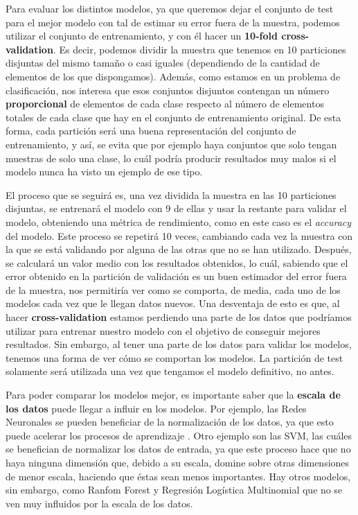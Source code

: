 \documentclass[11pt,a4paper]{article}
\begin{document}
Para evaluar los distintos modelos, ya que queremos dejar el conjunto de test para el mejor modelo con tal de estimar su error fuera de la
muestra, podemos utilizar el conjunto de entrenamiento, y con él hacer un \textbf{10-fold cross-validation}. Es decir, podemos dividir
la muestra que tenemos en 10 particiones disjuntas del mismo tamaño o casi iguales (dependiendo de la cantidad de elementos de los que
dispongamos). Además, como estamos en un problema de clasificación, nos interesa que esos conjuntos disjuntos contengan un número \textbf{proporcional}
de elementos de cada clase respecto al número de elementos totales de cada clase que hay en el conjunto de entrenamiento original. De esta
forma, cada partición será una buena representación del conjunto de entrenamiento, y así, se evita que por ejemplo haya conjuntos que solo
tengan muestras de solo una clase, lo cuál podría producir resultados muy malos si el modelo nunca ha visto un ejemplo de ese tipo.

El proceso que se seguirá es, una vez dividida la muestra en las 10 particiones disjuntas, se entrenará el modelo con 9 de ellas y
usar la restante para validar el modelo, obteniendo una métrica de rendimiento, como en este caso es el \textit{accuracy} del modelo.
Este proceso se repetirá 10 veces, cambiando cada vez la muestra con la que se está validando por alguna de las otras que no se han utilizado.
Después, se calculará un valor medio con los resultados obtenidos, lo cuál, sabiendo que el error obtenido en la partición de validación
es un buen estimador del error fuera de la muestra, nos permitiría ver como se comporta, de media, cada uno de los modelos cada vez que le
llegan datos nuevos. Una desventaja de esto es que, al hacer \textbf{cross-validation} estamos perdiendo una parte de los datos que podríamos
utilizar para entrenar nuestro modelo con el objetivo de conseguir mejores resultados. Sin embargo, al tener una parte de los datos para
validar los modelos, tenemos una forma de ver cómo se comportan los modelos. La partición de test solamente será utilizada una vez que tengamos
el modelo definitivo, no antes.

Para poder comparar los modelos mejor, es importante saber que la \textbf{escala de los datos} puede llegar a influir en los modelos. Por ejemplo,
las Redes Neuronales se pueden beneficiar de la normalización de los datos, ya que esto puede acelerar los procesos de aprendizaje
\cite{bib:normalize}. Otro ejemplo son las SVM, las cuáles se benefician de normalizar los datos de entrada, ya que este proceso hace
que no haya ninguna dimensión que, debido a su escala, domine sobre otras dimensiones de menor escala, haciendo que éstas sean menos importantes.
Hay otros modelos, sin embargo, como Ranfom Forest y Regresión Logística Multinomial que no se ven muy influidos por la escala de los datos.
\end{document}
